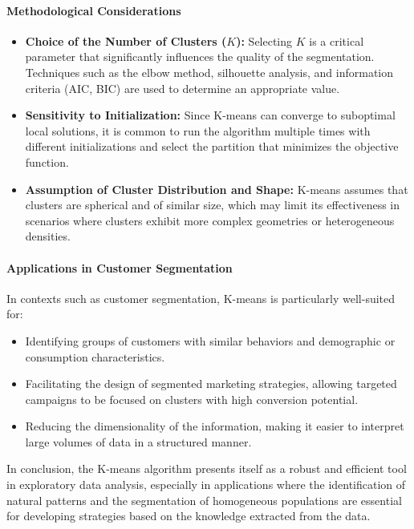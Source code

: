 \documentclass[10pt]{article}
\begin{document}
\paragraph{Methodological Considerations}  
\begin{itemize}
    \item \textbf{Choice of the Number of Clusters ($K$):} Selecting $K$ is a critical parameter that significantly influences the quality of the segmentation. Techniques such as the elbow method, silhouette analysis, and information criteria (AIC, BIC) are used to determine an appropriate value.
    \item \textbf{Sensitivity to Initialization:} Since K-means can converge to suboptimal local solutions, it is common to run the algorithm multiple times with different initializations and select the partition that minimizes the objective function.
    \item \textbf{Assumption of Cluster Distribution and Shape:} K-means assumes that clusters are spherical and of similar size, which may limit its effectiveness in scenarios where clusters exhibit more complex geometries or heterogeneous densities.
\end{itemize}
      

\paragraph{Applications in Customer Segmentation}  
In contexts such as customer segmentation, K-means is particularly well-suited for:
\begin{itemize}
    \item Identifying groups of customers with similar behaviors and demographic or consumption characteristics.
    \item Facilitating the design of segmented marketing strategies, allowing targeted campaigns to be focused on clusters with high conversion potential.
    \item Reducing the dimensionality of the information, making it easier to interpret large volumes of data in a structured manner.
\end{itemize}

In conclusion, the K-means algorithm presents itself as a robust and efficient tool in exploratory data analysis, especially in applications where the identification of natural patterns and the segmentation of homogeneous populations are essential for developing strategies based on the knowledge extracted from the data.
\end{document}
